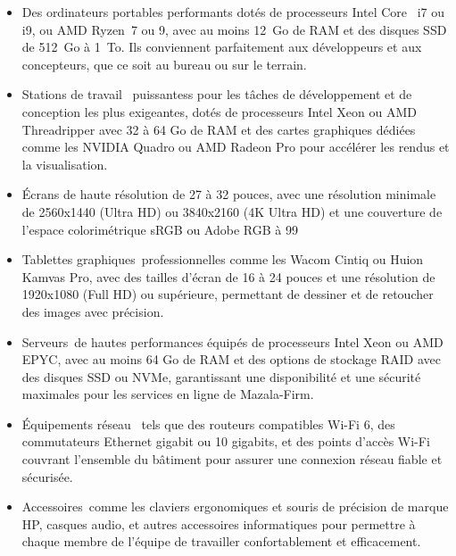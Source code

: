 \begin{itemize}
  \item Des ordinateurs portables performants dotés de processeurs Intel Core 
    i7 ou i9, ou AMD Ryzen 7 ou 9, avec au moins 12 Go de RAM et des disques
    SSD de 512 Go à 1 To. Ils conviennent parfaitement aux développeurs et aux
    concepteurs, que ce soit au bureau ou sur le terrain.

  \item Stations de travail  puissantess pour les tâches de développement et
    de conception les plus exigeantes, dotés de processeurs Intel Xeon ou AMD
    Threadripper avec 32 à 64 Go de RAM et des cartes graphiques dédiées comme
    les NVIDIA Quadro ou AMD Radeon Pro pour accélérer les rendus et la visualisation.

  \item Écrans de haute résolution de 27 à 32 pouces, avec une résolution
    minimale de 2560x1440 (Ultra HD) ou 3840x2160 (4K Ultra HD) et une couverture de
    l'espace colorimétrique sRGB ou Adobe RGB à 99%

  \item Tablettes graphiques professionnelles comme les Wacom Cintiq ou
    Huion Kamvas Pro, avec des tailles d'écran de 16 à 24 pouces et une
    résolution de 1920x1080 (Full HD) ou supérieure, permettant de dessiner et
    de retoucher des images avec précision.

  \item Serveurs de hautes performances équipés de processeurs Intel Xeon ou
    AMD EPYC, avec au moins 64 Go de RAM et des options de stockage RAID avec
    des disques SSD ou NVMe, garantissant une disponibilité et une sécurité
    maximales pour les services en ligne de Mazala-Firm.

  \item Équipements réseau  tels que des routeurs compatibles Wi-Fi 6, des
    commutateurs Ethernet gigabit ou 10 gigabits, et des points d'accès Wi-Fi
    couvrant l'ensemble du bâtiment pour assurer une connexion réseau fiable et
    sécurisée.

  \item Accessoires comme les claviers ergonomiques et souris de précision de
    marque HP, casques audio, et autres accessoires informatiques pour
    permettre à chaque membre de l’équipe de travailler confortablement et
    efficacement.

\end{itemize}



